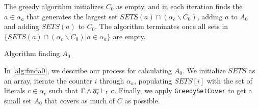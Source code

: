 

The greedy algorithm initializes $C_0$ as empty, and in each iteration finds the $a \in \alpha_a$ that generates the largest set $SETS(a) \cap (\alpha_c \backslash C_0)$, adding $a$ to $A_0$ and adding $SETS(a)$ to $C_0$.
The algorithm terminates once all sets in $\{SETS(a) \cap (\alpha_c \backslash C_0) | a \in \alpha_a \}$ are empty.


\begin{algorithm}
    \caption{Algorithm finding $A_0$}\label{alg:finda0}
    \SetAlgoNoLine
\end{algorithm}

In \autoref{alg:finda0}, we describe our process for calculating $A_0$. 
We initialize $SETS$ as an array, iterate the counter
$i$ through $\alpha_a$, populating $SETS[i]$ with the set of literals
$c \in \alpha_c$ such that $\Gamma \land \overline{a_i} \vdash_1 c$. Finally, we apply
\texttt{GreedySetCover} to get a small set $A_0$ that covers as much of $C$ as possible.

